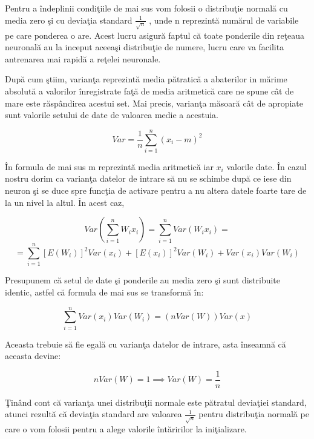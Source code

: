 \par

Pentru a \^{i}ndeplinii condi\c{t}iile de mai sus vom folosii o distribu\c{t}ie normal\u{a} cu media zero \c{s}i cu devia\c{t}ia standard $\frac{1}{\sqrt{n}}$ , unde n reprezint\u{a} num\u{a}rul de variabile pe care ponderea o are. Acest lucru asigur\u{a} faptul c\u{a} toate ponderile din re\c{t}eaua neuronal\u{a} au la inceput aceea\c{s}i distribu\c{t}ie de numere, lucru care va facilita antrenarea mai rapid\u{a} a re\c{t}elei neuronale.

\par 

Dup\u{a} cum \c{s}tiim, varian\c{t}a reprezint\u{a} media p\u{a}tratic\u{a} a abaterilor in m\u{a}rime absolut\u{a} a valorilor \^{i}nregistrate fa\c{t}\u{a} de media aritmetic\u{a} care ne spune c\^{a}t de mare este r\u{a}sp\^{a}ndirea  acestui set. Mai precis, varian\c{t}a m\u{a}soar\u{a} c\^{a}t de apropiate sunt valorile setului de date de valoarea medie a acestuia.

$$Var = \frac{1}{n} \sum_{i=1}^{n} (x_i - m )^2 $$

\^{I}n formula de mai sus m reprezint\u{a} media aritmetic\u{a} iar $x_i$ valorile date. \^{I}n cazul nostru dorim ca varian\c{t}a datelor de intrare s\u{a} nu se schimbe dup\u{a} ce iese din neuron \c{s}i se duce spre func\c{t}ia de activare pentru a nu altera datele foarte tare de la un nivel la altul. \^{I}n acest caz,

$$Var(\sum_{i=1}^{n} W_i x_i) = \sum_{i=1}^{n} Var(W_i x_i) = $$
$$ = \sum_{i=1}^{n} [E(W_i)]^2 Var(x_i) + [E(x_i)]^2 Var(W_i) + Var(x_i) Var(W_i)$$

Presupunem c\u{a} setul de date \c{s}i ponderile au media zero \c{s}i sunt distribuite identic, astfel c\u{a} formula de mai sus se transform\u{a} \^{i}n:

$$\sum_{i=1}^{n} Var(x_i) Var(W_i) = (n Var(W)) Var(x)$$

Aceasta trebuie s\u{a} fie egal\u{a} cu varian\c{t}a datelor de intrare, asta \^{i}nseamn\u{a} c\u{a} aceasta devine: 

$$n Var(W) = 1 \implies Var(W) =  \frac{1}{n} $$

\c{T}in\^{a}nd cont c\u{a} varian\c{t}a unei distribu\c{t}ii normale este p\u{a}tratul devia\c{t}iei standard, atunci rezult\u{a} c\u{a} devia\c{t}ia standard are valoarea $\frac{1}{\sqrt{n}}$ pentru distribu\c{t}ia normal\u{a} pe care o vom folosii pentru a alege valorile \^{i}nt\u{a}ririlor la ini\c{t}ializare.

